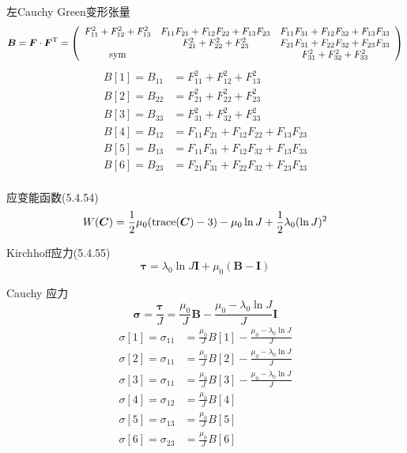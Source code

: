 \documentclass{article}
\begin{document}
左Cauchy Green变形张量
$$\bm{B}= \bm{F} \cdot \bm{F}^{\rm T}=\left(
    \begin{array}{ccc}
            F_{11}^2+F_{12}^2+F_{13}^2 & F_{11}F_{21}+F_{12}F_{22}+F_{13}F_{23} & F_{11}F_{31}+F_{12}F_{32}+F_{13}F_{33} \\
                                       & F_{21}^2+F_{22}^2+F_{23}^2             & F_{21}F_{31}+F_{22}F_{32}+F_{23}F_{33} \\
            {\rm sym}                  &                                        & F_{31}^2+F_{32}^2+F_{33}^2             \\
        \end{array}
    \right)$$
\begin{equation*}
    \begin{aligned}
        B[1]=B_{11} & =F_{11}^2+F_{12}^2+F_{13}^2             \\
        B[2]=B_{22} & =F_{21}^2+F_{22}^2+F_{23}^2             \\
        B[3]=B_{33} & =F_{31}^2+F_{32}^2+F_{33}^2             \\
        B[4]=B_{12} & =F_{11}F_{21}+F_{12}F_{22}+F_{13}F_{23} \\
        B[5]=B_{13} & =F_{11}F_{31}+F_{12}F_{32}+F_{13}F_{33} \\
        B[6]=B_{23} & =F_{21}F_{31}+F_{22}F_{32}+F_{23}F_{33} \\
    \end{aligned}
\end{equation*}

应变能函数\cite{bely}(5.4.54)
$$W(\bm{C})= \frac{1}{2}\mu_0({\rm trace}(\bm{C})-3)-\mu_0 \ln J + \frac{1}{2}\lambda_0(\ln J)^2$$


Kirchhoff应力\cite{bely}(5.4.55)
$$\bm{\tau}=\lambda_0\ln J\bm{I}+\mu_0(\bm{B}-\bm{I})$$

Cauchy 应力
$$\bm{\sigma}=\frac{\bm{\tau}}{J}=\frac{\mu_0}{J}\bm{B}-\frac{\mu_0-\lambda_0\ln J}{J}\bm{I}$$
\begin{equation*}
    \begin{aligned}
        \sigma[1]=\sigma_{11} & =\frac{\mu_0}{J}B[1]-\frac{\mu_0-\lambda_0\ln J}{J} \\
        \sigma[2]=\sigma_{11} & =\frac{\mu_0}{J}B[2]-\frac{\mu_0-\lambda_0\ln J}{J} \\
        \sigma[3]=\sigma_{11} & =\frac{\mu_0}{J}B[3]-\frac{\mu_0-\lambda_0\ln J}{J} \\
        \sigma[4]=\sigma_{12} & =\frac{\mu_0}{J}B[4]                                \\
        \sigma[5]=\sigma_{13} & =\frac{\mu_0}{J}B[5]                                \\
        \sigma[6]=\sigma_{23} & =\frac{\mu_0}{J}B[6]                                \\
    \end{aligned}
\end{equation*}
\end{document}
